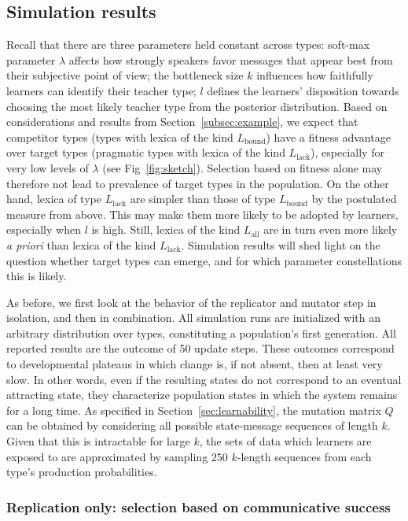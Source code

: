 \documentclass[a4paper, 11pt]{article}
\theoremstyle{Satz}
\newcommand{\mylang}[1]{\ensuremath{L_{\text{#1}}}\xspace} %
\newcommand{\Lall}{\mylang{all}}
\newcommand{\Lbound}{\mylang{bound}}
\newcommand{\Llack}{\mylang{lack}}
\begin{document}
\subsection{Simulation results}
\label{sec:simulation-results}
Recall that there are three parameters held constant across types: soft-max parameter $\lambda$
affects how strongly speakers favor messages that appear best from their subjective point of
view; the bottleneck size $k$ influences how faithfully learners can identify their teacher
type; $l$ defines the learners' disposition towards choosing the most likely teacher type from
the posterior distribution. Based on considerations and results from
Section~\ref{subsec:example}, we expect that competitor types (types with lexica of the kind
$\Lbound$) have a fitness advantage over target types (pragmatic types with lexica of the kind
$\Llack$), especially for very low levels of $\lambda$ (see Fig~\ref{fig:sketch}). Selection
based on fitness alone may therefore not lead to prevalence of target types in the
population. On the other hand, lexica of type $\Llack$ are simpler than those of type $\Lbound$
by the postulated measure from above. This may make them more likely to be adopted by learners,
especially when $l$ is high. Still, lexica of the kind $\Lall$ are in turn even more likely
\emph{a priori} than lexica of the kind $\Llack$. Simulation results will shed light on the
question whether target types can emerge, and for which parameter constellations this is
likely.

As before, we first look at the behavior of the replicator and mutator step in isolation, and
then in combination. All simulation runs are initialized with an arbitrary distribution over
types, constituting a population's first generation. All reported results are the outcome of 50
update steps. These outcomes correspond to developmental plateaus in which change is, if not
absent, then at least very slow. In other words, even if the resulting states do not correspond
to an eventual attracting state, they characterize population states in which the system
remains for a long time. As specified in Section~\ref{sec:learnability}, the mutation matrix
$Q$ can be obtained by considering all possible state-message sequences of length $k$. Given
that this is intractable for large $k$, the sets of data which learners are exposed to are
approximated by sampling $250$ $k$-length sequences from each type's production probabilities.


\subsubsection{Replication only: selection based on communicative success} 
\end{document}
